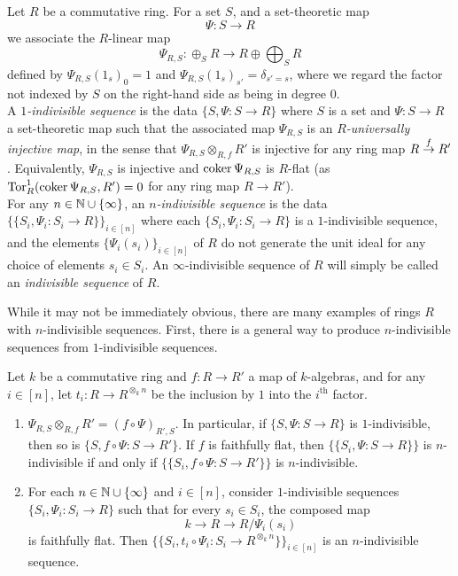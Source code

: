 \begin{definition}\label{definition:indivisible}
Let $R$ be a commutative ring. For a set $S$, and a set-theoretic map
\[\Psi: S \to R\]
we associate the $R$-linear map
\[\Psi_{R,S}: \oplus_{S} R \to R \oplus \bigoplus_{S} R\]
defined by $\Psi_{R,S}(1_s)_{0}= 1$ and $\Psi_{R,S}(1_{s})_{s'} = \delta_{s'=s}$, where we regard the factor not indexed by $S$ on the right-hand side as being in degree $0$.\\
\indent A \textit{$1$-indivisible sequence} is the data $\{S, \Psi: S \to R\}$ where $S$ is a set and $\Psi:S \to R$ a set-theoretic map such that the associated map $\Psi_{R,S}$ is an 
\textit{$R$-universally injective map}, in the sense that $\Psi_{R,S} \otimes_{R,f}R'$ is injective for any ring map $R \over{f}{\to} R'$. Equivalently, $\Psi_{R,S}$ is injective and 
$\coker{\Psi_{R,S}}$ is $R$-flat (as $\text{Tor}^1_R(\coker{\Psi_{R,S}}, R')=0$ for any ring map $R \to R'$).\\
\indent For any $n \in \bb{N} \cup \{\infty\}$, an \textit{$n$-indivisible sequence} is the data $\{\{S_i, \Psi_i:S_i \to R\}\}_{i \in [n]}$ where each $\{S_i, \Psi_i: S_i\to R\}$ 
is a $1$-indivisible sequence, and the elements $\{\Psi_i(s_i)\}_{i \in [n]}$ of $R$ do not generate the unit ideal for any choice of 
elements $s_i \in S_i$. An $\infty$-indivisible sequence of $R$ will simply be called an \textit{indivisible sequence} of $R$.
\end{definition}
While it may not be immediately obvious, there are many examples of rings $R$ with $n$-indivisible sequences. First, there is a general way to produce $n$-indivisible sequences from $1$-indivisible sequences.
\begin{proposition}\label{proposition:indivequiv}
Let $k$ be a commutative ring and $f: R \to R'$ a map of $k$-algebras, and for any $i \in [n]$, let $t_i: R \to R^{\otimes_k n}$ be the inclusion by $1$ into the $i^{\text{th}}$ factor.
\begin{enumerate}
\item[(i)] $\Psi_{R,S} \otimes_{R,f} R' = (f \circ \Psi)_{R',S}$. In particular, if $\{S, \Psi: S \to R\}$ is $1$-indivisible, then so is $\{S, f \circ \Psi: S \to R'\}$.
If $f$ is faithfully flat, then $\{\{S_i, \Psi: S \to R\}\}$ is $n$-indivisible if and only if $\{\{S_i, f \circ \Psi: S \to R'\}\}$ is $n$-indivisible.
\item[(ii)] For each $n \in \bb{N} \cup \{\infty\}$ and $i \in [n]$, consider $1$-indivisible sequences $\{S_i, \Psi_i:S_i \to R\}$ such that for every $s_i \in S_i$, the composed map 
\[k \to R \to R/\Psi_i(s_i)\]
is faithfully flat. Then $\{\{S_i, t_i \circ \Psi_i: S_i \to R^{\otimes_k n}\}\}_{i \in [n]}$ is an $n$-indivisible sequence.
\end{enumerate}
\end{proposition}
